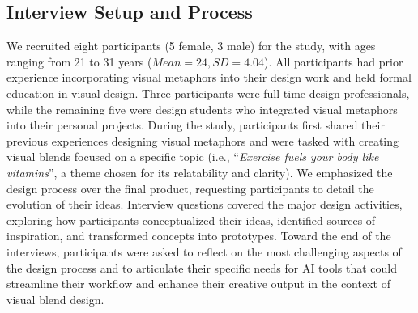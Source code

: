 







\subsection{Interview Setup and Process}


We recruited eight participants (5 female, 3 male) for the study, with ages ranging from 21 to 31 years ($Mean = 24, SD = 4.04$). 
All participants had prior experience incorporating visual metaphors into their design work and held formal education in visual design. Three participants were full-time design professionals, while the remaining five were design students who integrated visual metaphors into their personal projects.
During the study, participants first shared their previous experiences designing visual metaphors and were tasked with creating visual blends focused on a specific topic (i.e., ``\textit{Exercise fuels your body like vitamins}'', a theme chosen for its relatability and clarity). 
We emphasized the design process over the final product, requesting participants to detail the evolution of their ideas.
Interview questions covered the major design activities, exploring how participants conceptualized their ideas, identified sources of inspiration, and transformed concepts into prototypes. 
Toward the end of the interviews, participants were asked to reflect on the most challenging aspects of the design process and to articulate their specific needs for AI tools that could streamline their workflow and enhance their creative output in the context of visual blend design.


